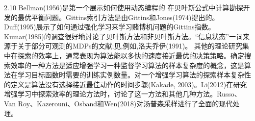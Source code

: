 2.10 Bellman(1956)是第一个展示如何使用动态编程的
在贝叶斯公式中计算勘探开发的最优平衡问题。Gittins索引方法是由Gittins和Jones(1974)提出的。Duff(1995)展示了如何通过强化学习来学习赌博机问题的Gittins指数。Kumar(1985)的调查很好地讨论了贝叶斯方法和非贝叶斯方法。“信息状态”一词来源于关于部分可观测的MDPs的文献;见,例如,洛夫乔伊(1991)。
其他的理论研究集中在探索的效率上，通常表现为算法能以多快的速度接近最优的决策策略。确定搜索效率的一种方法是适应增强学习一种监督学习算法的样本复杂度的概念，这是算法在学习目标函数时需要的训练实例数量。对一个增强学习算法的探索样本复杂性的定义是算法没有选择接近最佳动作的时间步骤(Kakade, 2003)。Li(2012)在研究增强学习中探索效率的理论方法时，讨论了这一方法和其他几种方法。Russo、Van Roy、Kazerouni、Osband和Wen(2018)对汤普森采样进行了全面的现代处理。
